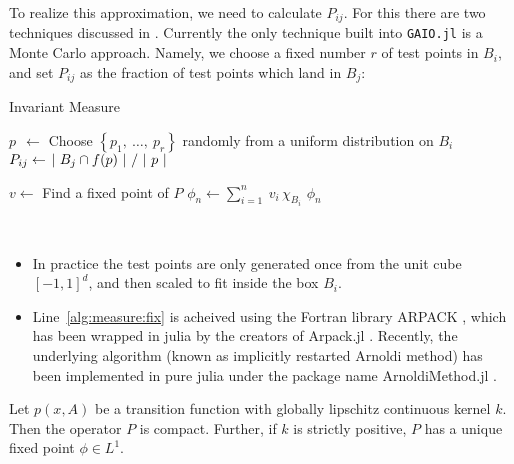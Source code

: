 To realize this approximation, we need to calculate $P_{ij}$. For this there are two 
techniques discussed in \cite*{algGAIO}. Currently the only technique built into 
\texttt{GAIO.jl} is a Monte Carlo approach. Namely, we choose a fixed number $r$ of 
test points in $B_i$, and set $P_{ij}$ as the fraction of test points which land in $B_j$:

\begin{algorithm}
    \caption{Invariant Measure}
    \label{alg:measure}
    \begin{spacing}{1.2}
        \begin{algorithmic}[1]

                \State $p\ \ \gets $ Choose $\left\{ p_1,\ \ldots,\ p_r \right\}$ randomly from a uniform distribution on $B_i$
                \State $P_{ij} \gets \left. |\ B_j \cap f(p)\ | \ \middle/\ |\ p\ | \right.$
            \EndFor
    
            \State $v \gets $ Find a fixed point of $P$
            \label{alg:measure:fix}
            \State $\phi_n \gets \sum_{i=1}^n\: v_i\, \chi_{B_i}$
            \State \Return $\phi_n$
        \end{algorithmic}
    \end{spacing}
\end{algorithm}

\begin{remark}\ 
    \begin{itemize}
        \item In practice the test points are only generated once from the unit cube $[-1,1]^d$, 
        and then scaled to fit inside the box $B_i$.
        \item Line~\ref{alg:measure:fix} is acheived using the Fortran library ARPACK \cite*{ARPACK}, 
        which has been wrapped in julia by the creators of Arpack.jl \cite*{Arpack.jl}. Recently, the 
        underlying algorithm (known as implicitly restarted Arnoldi method) has been 
        implemented in pure julia under the package name ArnoldiMethod.jl \cite*{ArnoldiMethod.jl}.
    \end{itemize}
\end{remark}

\begin{proposition}
    \cite*{lasota}
    Let $p(x, A)$ be a transition function with globally lipschitz continuous kernel $k$. 
    Then the operator $P$ is compact. Further, if $k$ is strictly positive, $P$ has
    a unique fixed point $\phi \in L^1$. 
\end{proposition}


